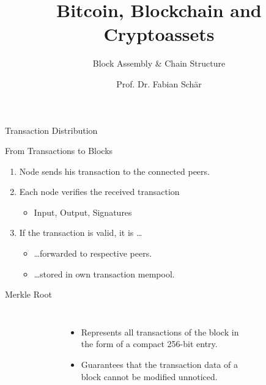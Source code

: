 \documentclass[]{beamer}
\title{Bitcoin, Blockchain and Cryptoassets}
\subtitle{Block Assembly \& Chain Structure}
\author{Prof. Dr. Fabian Schär}
\institute{University of Basel}
\begin{document}
\thispagestyle{empty}
\begin{frame}[noframenumbering]
	\titlepage
\end{frame}

\begin{frame}{Transaction Distribution}
\begin{figure}
	\centering
	\begin{tikzpicture}[scale=0.9, every node/.style={scale=0.9}]
		
	\end{tikzpicture}
\end{figure}
\end{frame}


\begin{frame}{From Transactions to Blocks}
	\begin{enumerate}
		\item<1-> Node sends his transaction to the connected peers.
		\item<1-> Each node verifies the received transaction
			\begin{itemize}
				\item<1-> Input, Output, Signatures
			\end{itemize}			 
		\item<1-> If the transaction is valid, it is \dots
			\begin{itemize}
				\item<1-> \dots forwarded to respective peers.
				\item<1-> \dots stored in own transaction mempool.
			\end{itemize}
	\end{enumerate}	
	\vspace{1em}
\end{frame}

\begin{frame}{Merkle Root}
	\begin{columns}
		\begin{figure}
			
		\end{figure}
		\begin{itemize}
			\item Represents all transactions of the block in the form of a compact 256-bit entry.
			\item Guarantees that the transaction data of a block cannot be modified unnoticed.
		\end{itemize}
		\begin{figure}
			
		\end{figure}
	\end{columns}
\end{frame}
\end{document}
